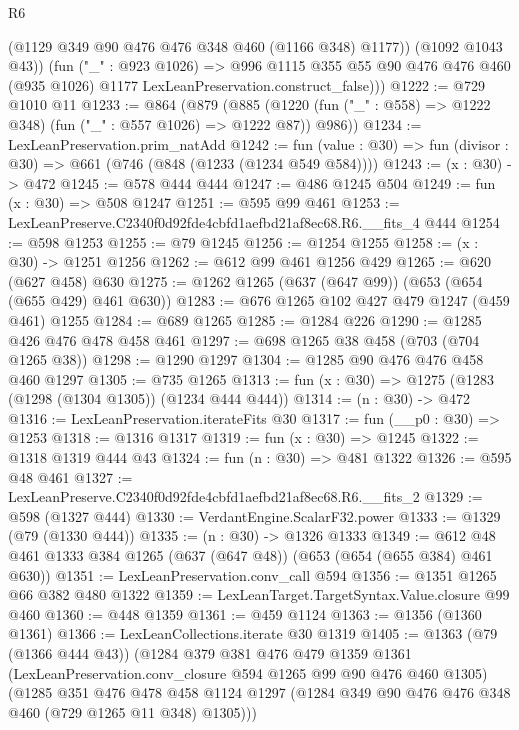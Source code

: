 \begin{lexlean}{R6}
\begin{coremodule}
            (@1129 @349 @90 @476 @476 @348 @460 (@1166 @348) @1177))
          (@1092 @1043 @43))
        (fun ("_" : @923 @1026) =>
        @996
          @1115
          @355
          @55
          @90
          @476
          @476
          @460
          (@935 @1026)
          @1177
          LexLeanPreservation.construct_false)))
@1222 := @729 @1010 @11
@1233 := @864
    (@879
      (@885 (@1220 (fun ("_" : @558) => @1222 @348) (fun ("_" : @557 @1026) => @1222 @87)) @986))
@1234 := LexLeanPreservation.prim_natAdd
@1242 := fun (value : @30) => fun (divisor : @30) => @661 (@746 (@848 (@1233 (@1234 @549 @584))))
@1243 := (x : @30) -> @472
@1245 := @578 @444 @444
@1247 := @486 @1245 @504
@1249 := fun (x : @30) => @508 @1247
@1251 := @595 @99 @461
@1253 := LexLeanPreserve.C2340f0d92fde4cbfd1aefbd21af8ec68.R6.__fits_4 @444
@1254 := @598 @1253
@1255 := @79 @1245
@1256 := @1254 @1255
@1258 := (x : @30) -> @1251 @1256
@1262 := @612 @99 @461 @1256 @429
@1265 := @620 (@627 @458) @630
@1275 := @1262 @1265 (@637 (@647 @99)) (@653 (@654 (@655 @429) @461 @630))
@1283 := @676 @1265 @102 @427 @479 @1247 (@459 @461) @1255
@1284 := @689 @1265
@1285 := @1284 @226
@1290 := @1285 @426 @476 @478 @458 @461
@1297 := @698 @1265 @38 @458 (@703 (@704 @1265 @38))
@1298 := @1290 @1297
@1304 := @1285 @90 @476 @476 @458 @460 @1297
@1305 := @735 @1265
@1313 := fun (x : @30) => @1275 (@1283 (@1298 (@1304 @1305)) (@1234 @444 @444))
@1314 := (n : @30) -> @472
@1316 := LexLeanPreservation.iterateFits @30
@1317 := fun (__p0 : @30) => @1253
@1318 := @1316 @1317
@1319 := fun (x : @30) => @1245
@1322 := @1318 @1319 @444 @43
@1324 := fun (n : @30) => @481 @1322
@1326 := @595 @48 @461
@1327 := LexLeanPreserve.C2340f0d92fde4cbfd1aefbd21af8ec68.R6.__fits_2
@1329 := @598 (@1327 @444)
@1330 := VerdantEngine.ScalarF32.power
@1333 := @1329 (@79 (@1330 @444))
@1335 := (n : @30) -> @1326 @1333
@1349 := @612 @48 @461 @1333 @384 @1265 (@637 (@647 @48)) (@653 (@654 (@655 @384) @461 @630))
@1351 := LexLeanPreservation.conv_call @594
@1356 := @1351 @1265 @66 @382 @480 @1322
@1359 := LexLeanTarget.TargetSyntax.Value.closure @99 @460
@1360 := @448 @1359
@1361 := @459 @1124
@1363 := @1356 (@1360 @1361)
@1366 := LexLeanCollections.iterate @30 @1319
@1405 := @1363
    (@79 (@1366 @444 @43))
    (@1284
      @379
      @381
      @476
      @479
      @1359
      @1361
      (LexLeanPreservation.conv_closure @594 @1265 @99 @90 @476 @460 @1305)
      (@1285
        @351
        @476
        @478
        @458
        @1124
        @1297
        (@1284 @349 @90 @476 @476 @348 @460 (@729 @1265 @11 @348) @1305)))

\end{coremodule}
\end{lexlean}
